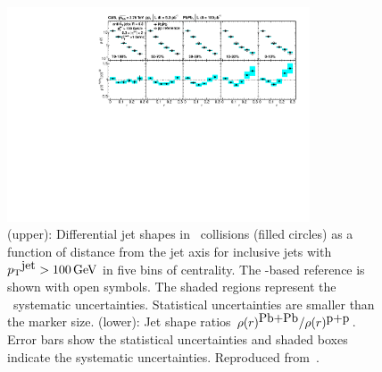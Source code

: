 
\begin{figure}[!ht]
\begin{center}
\includegraphics[width=0.8\textwidth]{jetfigures/cms_shape_Figure2.pdf}
\caption{
%
(upper): Differential jet shapes in \PbPb\ collisions (filled circles)
as a function of distance from the jet axis for inclusive jets with $\mbox{$p_{\mathrm{T}}$}^{\mbox{jet}} >100\,\mathrm{GeV}$
in five bins of centrality.  The \pp-based reference is shown with open symbols.
The shaded regions represent the \PbPb\ systematic uncertainties.
Statistical uncertainties are smaller than the marker size.
(lower): Jet shape ratios $\rho(r)^{\mbox{Pb+Pb}}/\rho(r)^{\mbox{p+p}}$.
Error bars show the statistical uncertainties and shaded boxes indicate the systematic uncertainties. 
Reproduced from~\cite{Chatrchyan:2013kwa}.
}
\label{fig:pas:CMS_shape}
\end{center}
\end{figure}

